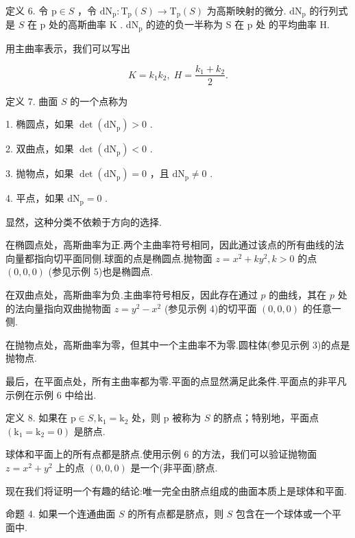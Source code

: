 定义 6. 令 \(\mathrm{p} \in  S\) ，令 \({\mathrm{{dN}}}_{\mathrm{p}} : {\mathrm{T}}_{\mathrm{p}}\left( S\right)  \rightarrow  {\mathrm{T}}_{\mathrm{p}}\left( S\right)\) 为高斯映射的微分. \({\mathrm{{dN}}}_{\mathrm{p}}\) 的行列式是 \(S\) 在 \(\mathrm{p}\) 处的高斯曲率 \(\mathrm{K}\) . \({\mathrm{{dN}}}_{\mathrm{p}}\) 的迹的负一半称为 S 在 p 处 的平均曲率 H.

用主曲率表示，我们可以写出

\[
K = {k}_{1}{k}_{2},\;H = \frac{{k}_{1} + {k}_{2}}{2}.
\]

定义 7. 曲面 \(S\) 的一个点称为

1. 椭圆点，如果 \(\det \left( {\mathrm{{dN}}}_{\mathrm{p}}\right)  > 0\) .

2. 双曲点，如果 \(\det \left( {\mathrm{{dN}}}_{\mathrm{p}}\right)  < 0\) .

3. 抛物点，如果 \(\det \left( {\mathrm{{dN}}}_{\mathrm{p}}\right)  = 0\) ，且 \({\mathrm{{dN}}}_{\mathrm{p}} \neq  0\) .

4. 平点，如果 \({\mathrm{{dN}}}_{\mathrm{p}} = 0\) .

显然，这种分类不依赖于方向的选择.

在椭圆点处，高斯曲率为正.两个主曲率符号相同，因此通过该点的所有曲线的法向量都指向切平面同侧.球面的点是椭圆点.抛物面 \(z = {x}^{2} + k{y}^{2},k > 0\) 的点 \(\left( {0,0,0}\right)\) (参见示例 5)也是椭圆点.

在双曲点处，高斯曲率为负.主曲率符号相反，因此存在通过 \(p\) 的曲线，其在 \(p\) 处的法向量指向双曲抛物面 \(z = {y}^{2} - {x}^{2}\) (参见示例 4)的切平面 \(\left( {0,0,0}\right)\) 的任意一侧.

在抛物点处，高斯曲率为零，但其中一个主曲率不为零.圆柱体(参见示例 3)的点是抛物点.

最后，在平面点处，所有主曲率都为零.平面的点显然满足此条件.平面点的非平凡示例在示例 6 中给出.

定义 8. 如果在 \(\mathrm{p} \in  S,{\mathrm{k}}_{1} = {\mathrm{k}}_{2}\) 处，则 \(\mathrm{p}\) 被称为 \(S\) 的脐点；特别地，平面点 \(\left( {{\mathrm{k}}_{1} = {\mathrm{k}}_{2} = 0}\right)\) 是脐点.

球体和平面上的所有点都是脐点.使用示例 6 的方法，我们可以验证抛物面 \(z = {x}^{2} + {y}^{2}\) 上的点 \(\left( {0,0,0}\right)\) 是一个(非平面)脐点.

现在我们将证明一个有趣的结论:唯一完全由脐点组成的曲面本质上是球体和平面.

命题 4. 如果一个连通曲面 \(S\) 的所有点都是脐点，则 \(S\) 包含在一个球体或一个平面中.

